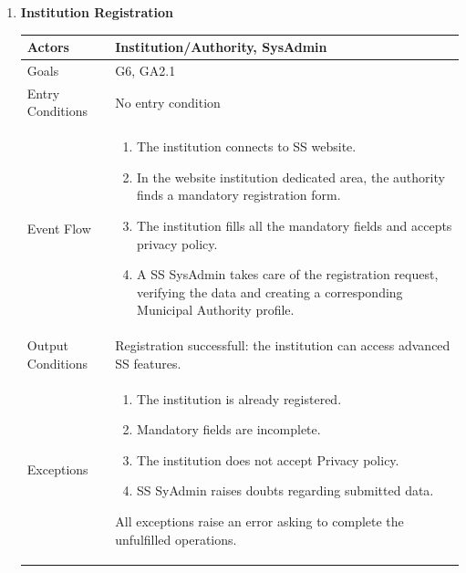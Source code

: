 \begin{enumerate}
	\clearpage
	
	\item \textbf{Institution Registration}
		\begin{table}[h!]
		\centering
		\begin{tabular}{|l|p{}|}
		\hline
		Actors            			&       	Institution/Authority, SysAdmin\\ \hline
		Goals             			&         	G6, GA2.1\\ \hline
		Entry Conditions  	&  		No entry condition\\ \hline
		Event Flow        		&          
				\begin{enumerate}[label=\alph*)]
					\item The institution connects to SS website.
					\item In the website institution dedicated area, the authority finds a mandatory registration form. 
					\item The institution fills all the mandatory fields and accepts privacy policy.
					\item A SS SysAdmin takes care of the registration request, verifying the data and creating a corresponding Municipal Authority profile.
					\end{enumerate}\\ \hline
		Output Conditions &    		Registration successfull: the institution can access advanced SS features.\\ \hline
		Exceptions        		& 
				\begin{enumerate}[label=\alph*)]
					\item The institution is already registered.
					\item Mandatory fields are incomplete.
					\item The institution does not accept Privacy policy.
					\item SS SyAdmin raises doubts regarding submitted data.
				\end{enumerate}
				All exceptions raise an error asking to complete the unfulfilled operations. \\ 
				\hline
	\end{tabular}
	\end{table}
	

\end{enumerate}
